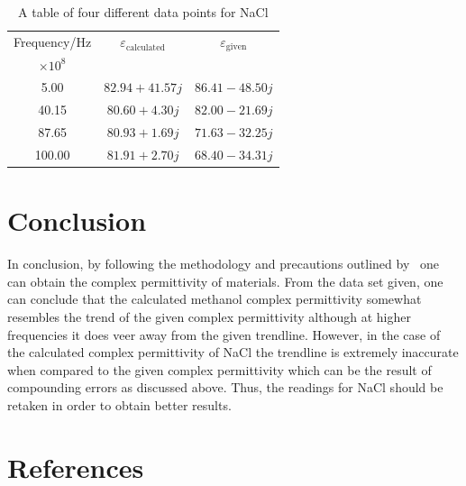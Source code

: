 \documentclass[12pt, a4paper]{article}
\begin{document}
\begin{table}[H]
    \centering
    \begin{tabular}{ccc}
    \hline
    Frequency/Hz &
      \(\varepsilon_{\mathrm{calculated}}\) &
      \(\varepsilon_{\mathrm{given}}\) \\
      \(\times 10^8\)& & \\ \hline \hline
      5.00   & \(82.94+41.57j\) & \(86.41-48.50j\) \\
      40.15  & \(80.60+4.30j\)  & \(82.00-21.69j\) \\
      87.65  & \(80.93+1.69j\)  & \(71.63-32.25j\) \\
      100.00 & \(81.91+2.70j\)  & \(68.40-34.31j\) \\ \hline
    \end{tabular}
    \caption{A table of four different data points for NaCl}\label{tab: Table 2}
\end{table}

\section{Conclusion}
In conclusion, by following the methodology and precautions outlined by~\cite{marsland1987dielectric} one can obtain the complex permittivity of materials. From the data set given, one can conclude that the calculated methanol complex permittivity somewhat resembles the trend of the given complex permittivity although at higher frequencies it does veer away from the given trendline. However, in the case of the calculated complex permittivity of NaCl the trendline is extremely inaccurate when compared to the given complex permittivity which can be the result of compounding errors as discussed above. Thus, the readings for NaCl should be retaken in order to obtain better results.


\section{References}
\printbibliography[heading = none]
\end{document}
